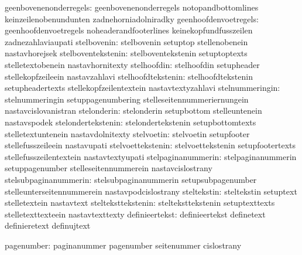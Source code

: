        geenbovenenonderregels:  geenbovenenonderregels       notopandbottomlines
                                keinzeilenobenundunten       zadnehorniadolniradky
        geenhoofdenvoetregels:  geenhoofdenvoetregels        noheaderandfooterlines
                                keinekopfundfusszeilen       zadnezahlaviaupati
                  stelbovenin:  stelbovenin                  setuptop
                                stellenobenein               nastavhorejsek
           stelboventekstenin:  stelboventekstenin           setuptoptexts
                                stelletextobenein            nastavhornitexty
                  stelhoofdin:  stelhoofdin                  setupheader
                                stellekopfzeileein           nastavzahlavi
           stelhoofdtekstenin:  stelhoofdtekstenin           setupheadertexts
                                stellekopfzeilentextein      nastavtextyzahlavi
              stelnummeringin:  stelnummeringin              setuppagenumbering
                                stelleseitennummeriernungein nastavcislovanistran
                  stelonderin:  stelonderin                  setupbottom
                                stelleuntenein               nastavspodek
           stelondertekstenin:  stelondertekstenin           setupbottomtexts
                                stelletextuntenein           nastavdolnitexty
                   stelvoetin:  stelvoetin                   setupfooter
                                stellefusszeileein           nastavupati
            stelvoettekstenin:  stelvoettekstenin            setupfootertexts
                                stellefusszeilentextein      nastavtextyupati
           stelpaginanummerin:  stelpaginanummerin           setuppagenumber
                                stelleseitennummerein        nastavcislostrany
        stelsubpaginanummerin:  stelsubpaginanummerin        setupsubpagenumber
                                stelleunterseitennummerein   nastavpodcislostrany
                  steltekstin:  steltekstin                  setuptext
                                stelletextein                nastavtext
           stelteksttekstenin:  stelteksttekstenin           setuptexttexts
                                stelletexttexteein           nastavtexttexty
               definieertekst:  definieertekst               definetext
                                definieretext                definujtext

                   pagenumber:  paginanummer                 pagenumber
                                seitenummer                  cislostrany

